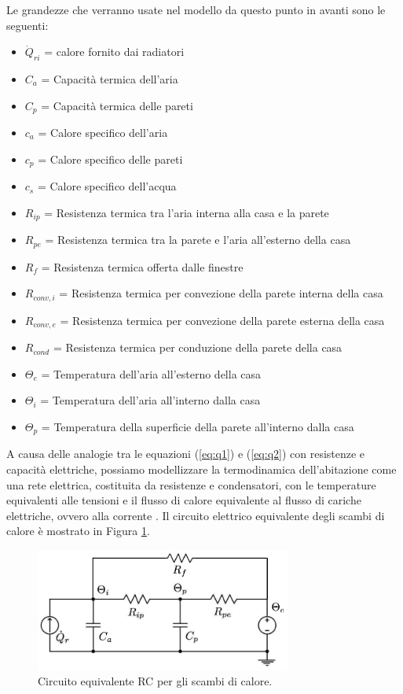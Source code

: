 \documentclass[laurea,oneside,11pt]{USiena_tesiLM3}
\begin{document}
Le grandezze che verranno usate nel modello da questo punto in avanti sono le seguenti:
\begin{itemize}
\item[] $\dot{Q}_{ri}$ = calore fornito dai radiatori
\item[]$C_a$ = Capacità termica dell'aria 
\item[]$C_p$ = Capacità termica delle pareti
\item[]$c_a$ = Calore specifico dell'aria 
\item[]$c_p$ = Calore specifico delle pareti
\item[]$c_s$ = Calore specifico dell'acqua
\item[]$R_{ip}$ = Resistenza termica tra l'aria interna alla casa e la parete 
\item[]$R_{pe}$ = Resistenza termica tra la parete e l'aria all'esterno della casa
\item[]$R_{f}$ = Resistenza termica offerta dalle finestre 
\item[]$R_{conv,i}$ = Resistenza termica per convezione della  parete interna della casa
\item[]$R_{conv,e}$ = Resistenza termica per convezione della  parete esterna della casa
\item[]$R_{cond}$ = Resistenza termica per conduzione della parete della casa
\item[]$\Theta_{e}$ = Temperatura dell'aria all'esterno della casa
\item[]$\Theta_i$ = Temperatura dell'aria all'interno dalla casa
\item[]$\Theta_p$ = Temperatura della superficie della parete all'interno dalla casa 
\end{itemize}


A causa delle analogie tra le equazioni (\ref{eq:q1}) e (\ref{eq:q2}) con resistenze e capacità elettriche, possiamo modellizzare la termodinamica dell'abitazione come una rete elettrica, costituita da resistenze e condensatori, con le temperature equivalenti alle tensioni e il flusso di calore equivalente al flusso di cariche elettriche, ovvero alla corrente \cite{thavlov2020thermal}. Il circuito elettrico equivalente degli scambi di calore è mostrato in Figura \ref{fig:RC}.

\begin{figure}[h]
\begin{center}
\includegraphics[width=0.75\textwidth]{figure/schema_trasf_calore}
\caption{Circuito equivalente RC per gli scambi di calore.}
\label{fig:RC}
\end{center}
\end{figure}
 
\end{document}
